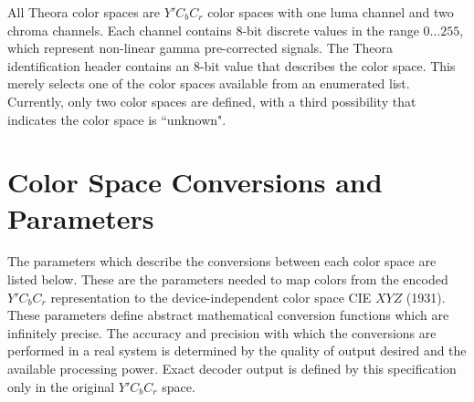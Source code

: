 \documentclass[11pt,letterpaper]{book}
\numberwithin{equation}{chapter}
\numberwithin{figure}{chapter}
\numberwithin{table}{chapter}
\begin{document}
All Theora color spaces are $Y'C_bC_r$ color spaces with one luma channel and
 two chroma channels.
Each channel contains 8-bit discrete values in the range $0\ldots255$, which
 represent non-linear gamma pre-corrected signals.
The Theora identification header contains an 8-bit value that describes the
 color space.
This merely selects one of the color spaces available from an enumerated list.
Currently, only two color spaces are defined, with a third possibility that
 indicates the color space is ``unknown".

\section{Color Space Conversions and Parameters}
\label{sec:color-xforms}

The parameters which describe the conversions between each color space are
 listed below.
These are the parameters needed to map colors from the encoded $Y'C_bC_r$
 representation to the device-independent color space CIE $XYZ$ (1931).
These parameters define abstract mathematical conversion functions which are
 infinitely precise.
The accuracy and precision with which the conversions are performed in a real
 system is determined by the quality of output desired and the available
 processing power.
Exact decoder output is defined by this specification only in the original
 $Y'C_bC_r$ space.
\end{document}
